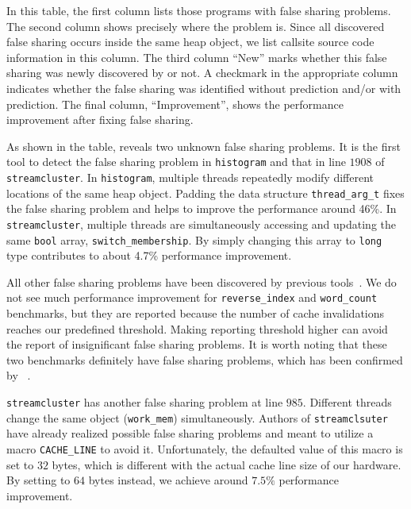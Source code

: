 In this table, the first column lists those programs with false
sharing problems.  The second column shows precisely where the problem
is. Since all discovered false sharing occurs inside the same heap
object, we list callsite source code information in this column.  The
third column ``New'' marks whether this false sharing was newly
discovered by \Predator{} or not.  A checkmark in the appropriate
column indicates whether the false sharing was identified without
prediction and/or with prediction.  The final column, ``Improvement'',
shows the performance improvement after fixing false sharing.

As shown in the table, \Predator{} reveals two unknown false sharing problems. 
It is the first tool to detect the false sharing problem in \texttt{histogram} 
and that in line $1908$ of \texttt{streamcluster}. 
In \texttt{histogram}, multiple threads repeatedly modify different locations of the same heap object. 
Padding the data structure \texttt{thread\_arg\_t} fixes the false sharing problem and 
helps to improve the performance around 46\%.
In \texttt{streamcluster}, multiple threads are simultaneously accessing and updating 
the same \texttt{bool} array, \texttt{switch\_membership}. 
By simply changing this array to \texttt{long} type contributes to about 4.7\% performance improvement.

All other false sharing problems have been discovered by previous tools~\cite{sheriff}.
We do not see much performance improvement for \texttt{reverse\_index} and 
\texttt{word\_count} benchmarks, but they are reported because the number of cache invalidations 
reaches our predefined threshold.
Making reporting threshold higher can avoid the report of insignificant false sharing problems.
It is worth noting that these two benchmarks definitely have false sharing problems,
which has been confirmed by \Sheriff~\cite{sheriff}. 

\texttt{streamcluster} has another false sharing problem at line $985$. 
Different threads change the same object (\texttt{work\_mem}) simultaneously. 
Authors of \texttt{streamclsuter} have already realized possible
false sharing problems and meant to utilize a macro \texttt{CACHE\_LINE} to avoid it. Unfortunately,
the defaulted value of this macro is set to $32$ bytes, which is different with the actual
cache line size of our hardware. By setting to $64$ bytes instead, we achieve around $7.5\%$ performance improvement.

